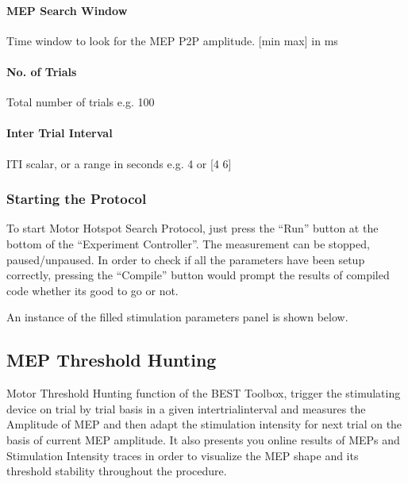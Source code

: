 \documentclass[letterpaper,10pt,english]{sphinxmanual}
\begin{document}
\paragraph{MEP Search Window}
\label{\detokenize{6_MEPHotspotSearch:mep-search-window}}
\sphinxAtStartPar
Time window to look for the MEP P2P amplitude. {[}min max{]} in ms


\paragraph{No. of Trials}
\label{\detokenize{6_MEPHotspotSearch:no-of-trials}}
\sphinxAtStartPar
Total number of trials e.g. 100


\paragraph{Inter Trial Interval}
\label{\detokenize{6_MEPHotspotSearch:inter-trial-interval}}
\sphinxAtStartPar
ITI scalar, or a range in seconds e.g. 4 or {[}4 6{]}


\subsubsection{Starting the Protocol}
\label{\detokenize{6_MEPHotspotSearch:starting-the-protocol}}
\sphinxAtStartPar
To start Motor Hotspot Search Protocol, just press the “Run” button at the bottom of the “Experiment Controller”. The measurement can be stopped, paused/unpaused. In order to check if all the parameters have been setup correctly, pressing the “Compile” button would prompt the results of compiled code whether its good to go or not.

\sphinxAtStartPar
An instance of the filled stimulation parameters panel is shown below.

\begin{figure}[htbp]
\centering

\noindent{}
\end{figure}


\subsection{MEP Threshold Hunting}
\label{\detokenize{7_MEPThresholdHunting:mep-threshold-hunting}}\label{\detokenize{7_MEPThresholdHunting::doc}}
\sphinxAtStartPar
Motor Threshold Hunting function of the BEST Toolbox, trigger the stimulating device on trial by trial basis in a given inter\sphinxhyphen{}trial\sphinxhyphen{}interval and measures the Amplitude of MEP and then adapt the stimulation intensity for next trial on the basis of current MEP amplitude. It also presents you online results of MEPs and Stimulation Intensity traces in order to visualize the MEP shape and its threshold stability throughout the procedure.
\end{document}
